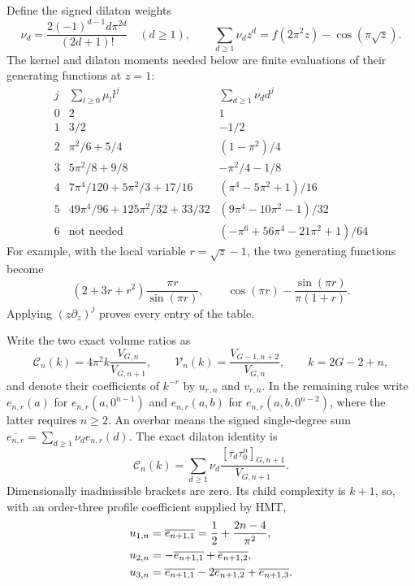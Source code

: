 \documentclass[a4paper,10pt]{article}
\numberwithin{equation}{section}
\theoremstyle{paperplain}
\theoremstyle{paperremark}
\theoremstyle{paperplain}
\begin{document}
Define the signed dilaton weights
\begin{equation}\label{eq:a:dilaton-weights}
 \nu_d=\frac{2(-1)^{d-1}d\pi^{2d}}{(2d+1)!}\quad(d\geq1),\qquad
 \sum_{d\geq1}\nu_d z^d
   =f(2\pi^2z)-\cos(\pi\sqrt z).
\end{equation}
The kernel and dilaton moments needed below are finite evaluations of
their generating functions at $z=1$:
\begin{equation}\label{eq:a:finite-moments}
\begin{array}{c|c|c}
 j&\sum_{l\geq0}\mu_l l^j&\sum_{d\geq1}\nu_d d^j\\\hline
0&2&1\\
1&3/2&-1/2\\
2&\pi^2/6+5/4&(1-\pi^2)/4\\
3&5\pi^2/8+9/8&-\pi^2/4-1/8\\
4&7\pi^4/120+5\pi^2/3+17/16&(\pi^4-5\pi^2+1)/16\\
5&49\pi^4/96+125\pi^2/32+33/32&(9\pi^4-10\pi^2-1)/32\\
6&\text{not needed}&(-\pi^6+56\pi^4-21\pi^2+1)/64
\end{array}
\end{equation}
For example, with the local variable $r=\sqrt z-1$, the two generating
functions become
\[
 (2+3r+r^2)\frac{\pi r}{\sin(\pi r)},\qquad
 \cos(\pi r)-\frac{\sin(\pi r)}{\pi(1+r)}.
\]
Applying $(z\partial_z)^j$ proves every entry of the table.

Write the two exact volume ratios as
\begin{equation}\label{eq:a:local-ratios}
 \mathcal C_n(k)=4\pi^2 k\frac{V_{G,n}}{V_{G,n+1}},\qquad
 \mathcal V_n(k)=\frac{V_{G-1,n+2}}{V_{G,n}},
 \qquad k=2G-2+n,
\end{equation}
and denote their coefficients of $k^{-r}$ by $u_{r,n}$ and $v_{r,n}$.
In the remaining rules write $e_{n,r}(a)$ for
$e_{n,r}(a,0^{n-1})$ and $e_{n,r}(a,b)$ for
$e_{n,r}(a,b,0^{n-2})$, where the latter requires $n\geq2$.
An overbar means the signed single-degree sum
$\overline{e_{n,r}}=\sum_{d\geq1}\nu_d e_{n,r}(d)$.
The exact dilaton identity is
\begin{equation}\label{eq:a:exact-cusp}
 \mathcal C_n(k)
 =\sum_{d\geq1}\nu_d
       \frac{[\tau_d\tau_0^n]_{G,n+1}}{V_{G,n+1}}.
\end{equation}
Dimensionally inadmissible brackets are zero. Its child complexity is
$k+1$, so, with an order-three profile coefficient supplied by HMT,
\begin{align}
 u_{1,n}&=\overline{e_{n+1,1}}
                 =\frac12+\frac{2n-4}{\pi^2},\notag\\
 u_{2,n}&=-\overline{e_{n+1,1}}+\overline{e_{n+1,2}},\notag\\
 u_{3,n}&=\overline{e_{n+1,1}}-2\overline{e_{n+1,2}}
                                      +\overline{e_{n+1,3}}.
 \label{eq:a:cusp-extraction}
\end{align}
\end{document}
